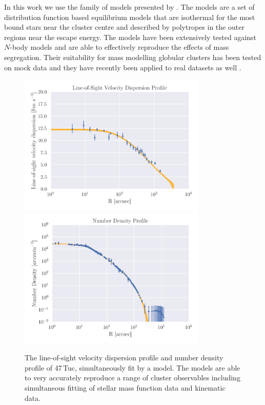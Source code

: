 In this work we use the  family of models presented by \citet{Gieles2015}. The
 models are a set of distribution function based equilibrium models that are isothermal
for the most bound stars near the cluster centre and described by polytropes in the outer regions
near the escape energy. The models have been extensively tested against $N$-body models
\citep{Zocchi2016, Peuten2017} and are able to effectively reproduce the effects of mass
segregation. Their suitability for mass modelling globular clusters has been tested on mock data
\citep{Henault-Brunet2019} and they have recently been applied to real datasets as well
\citep[e.g.][]{Gieles2018, Henault-Brunet2020}.


\begin{figure}
	\centering
	\includegraphics[width=0.8\textwidth]{./figures/limepy_veldisp.png}
	\includegraphics[width=0.8\textwidth]{./figures/limepy_numdens.png}
	\caption{The line-of-sight velocity dispersion profile and number density profile of
		47\,Tuc, simultaneously fit by a  model. The  models are
		able to very accurately reproduce a range of cluster observables including
		simultaneous fitting of stellar mass function data and kinematic data.}
	\label{fig:1/limepy_models}
\end{figure}


